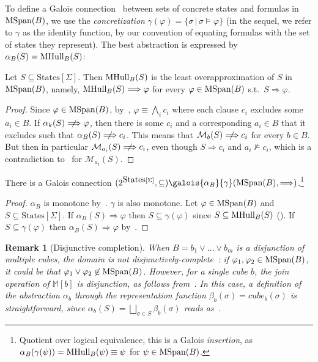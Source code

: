 \documentclass[acmsmall,screen]{acmart}
\newtheorem{remark}[theo]{Remark}
\renewcommand{\implies}{\Longrightarrow}
\newcommand{\notimplies}{\centernot\implies}
\newcommand{\vocabulary}{\Sigma}
\newcommand{\voc}{\vocabulary}
\newcommand{\States}{{\mbox{States}}[\voc]}
\newcommand{\set}[1]{\{{#1}\}}
\newcommand{\cubemon}[2]{\textit{cube}_{{#2}}({#1})}
\newcommand{\moncube}[2]{\cubemon{#1}{#2}}
\newcommand{\monox}[2]{\mathcal{M}_{#2}({#1})}
\newcommand{\mspan}[1]{{\rm MSpan}({#1})}
\newcommand{\mhull}[2]{{\rm MHull}_{#2}({#1})}
\newcommand{\malpha}[1]{\alpha_{#1}}
\newcommand{\madom}[1]{\mathbb{M}[{#1}]}
\newcommand{\bkcube}{b}
\newcommand{\bigjoin}{\bigsqcup}
\begin{document}
To define a Galois connection~\cite{DBLP:conf/popl/CousotC77} between sets of concrete states and formulas in $\mspan{B}$, we use the \emph{concretization} $\gamma(\varphi) = \set{\sigma \, | \, \sigma \models \varphi}$ (in the sequel, we refer to $\gamma$ as the identity function, by our convention of equating formulas with the set of states they represent). %
%
The best abstraction is expressed by $\malpha{B}(S)=\mhull{S}{B}$:
\begin{lemma}
\label{lem:best-abstraction}
Let $S \subseteq \States$. Then $\mhull{S}{B}$ is the least overapproximation of $S$ in $\mspan{B}$, namely, $\mhull{S}{B} \implies \varphi$ for every $\varphi \in \mspan{B}$ s.t.\ $S \implies \varphi$.
\end{lemma}
\begin{proof}
Since $\varphi \in \mspan{B}$, by~, $\varphi \equiv \bigwedge_{i}{c_i}$ where each clause $c_i$ excludes some $a_i \in B$. If $\malpha{k}(S) \notimplies \varphi$, then there is some $c_i$ and a corresponding $a_i \in B$ that it excludes such that $\malpha{B}(S) \notimplies c_i$. This means that $\monox{S}{b} \notimplies c_i$ for every $b \in B$. But then in particular $\monox{S}{a_i} \notimplies c_i$, even though $S \implies c_i$ and $a_i \not\models c_i$, which is a contradiction to~ for $\monox{S}{a_i}$.
\end{proof}

%
%
\begin{lemma}
There is a Galois connection $(2^{\States}, \subseteq) \galois{\malpha{B}}{\gamma} (\mspan{B}, \implies)$.\footnote{
	Quotient over logical equivalence, this is a Galois \emph{insertion}, as $\malpha{B}(\gamma(\psi))=\mhull{\psi}{B}\equiv\psi$ for $\psi \in \mspan{B}$.
}
\end{lemma}
\begin{proof}
$\malpha{B}$ is monotone by~.
%
$\gamma$ is also monotone.
Let $\varphi \in \mspan{B}$ and $S \subseteq \States$.
If $\malpha{B}(S) \implies \varphi$ then $S \subseteq \gamma(\varphi)$ since $S \subseteq \mhull{S}{B}$ ().
If $S \subseteq \gamma(\varphi)$ then $\malpha{B}(S) \implies \varphi$ by~.
\end{proof}

%
%
%
%
%
%
%
%
%
%
%
%
%

%
%
%
%
%

\begin{remark}[Disjunctive completion]
When $B = \bkcube_1 \lor \ldots \lor \bkcube_m$
%
is a disjunction of multiple cubes, the domain is not disjunctively-complete~\cite{POPL:CC79}: if $\varphi_1,\varphi_2 \in \mspan{B}$, it could be that $\varphi_1 \lor \varphi_2 \not\in \mspan{B}$.
However, for a single cube $\bkcube$, the join operation of $\madom{\bkcube}$ is disjunction, as follows from~.
In this case, a definition of the abstraction $\malpha{\bkcube}$ through the representation function $\beta_{\bkcube}(\sigma)=\moncube{\sigma}{\bkcube}$ is straightforward, since $\malpha{\bkcube}(S) = {\bigjoin_{\sigma \in S}}{\beta_{\bkcube}(\sigma)}$ reads as~.
\end{remark}
\end{document}
